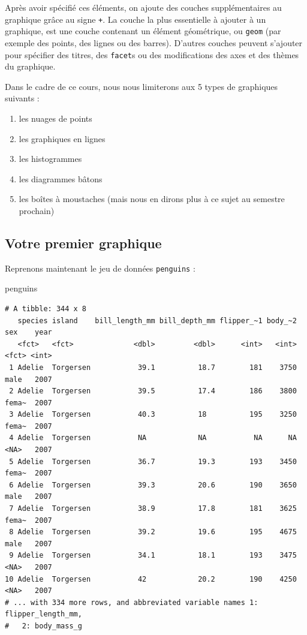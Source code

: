 \documentclass[
  letterpaper,
  DIV=11,
  numbers=noendperiod]{scrreprt}
\newenvironment{Shaded}{\begin{snugshade}}{\end{snugshade}}
\newcommand{\NormalTok}[1]{\textcolor[rgb]{0.00,0.23,0.31}{#1}}
\providecommand{\tightlist}{%
  \setlength{\itemsep}{0pt}\setlength{\parskip}{0pt}}\usepackage{longtable,booktabs,array}
\begin{document}
Après avoir spécifié ces éléments, on ajoute des couches supplémentaires
au graphique grâce au signe \texttt{+}. La couche la plus essentielle à
ajouter à un graphique, est une couche contenant un élément géométrique,
ou \texttt{geom} (par exemple des points, des lignes ou des barres).
D'autres couches peuvent s'ajouter pour spécifier des titres, des
\texttt{facet}s ou des modifications des axes et des thèmes du
graphique.

Dans le cadre de ce cours, nous nous limiterons aux 5 types de
graphiques suivants :

\begin{enumerate}
\def\labelenumi{\arabic{enumi}.}
\tightlist
\item
  les nuages de points
\item
  les graphiques en lignes
\item
  les histogrammes
\item
  les diagrammes bâtons
\item
  les boîtes à moustaches (mais nous en dirons plus à ce sujet au
  semestre prochain)
\end{enumerate}

\hypertarget{votre-premier-graphique}{%
\subsection{Votre premier graphique}\label{votre-premier-graphique}}

Reprenons maintenant le jeu de données \texttt{penguins} :

\begin{Shaded}
\begin{Highlighting}[]
\NormalTok{penguins}
\end{Highlighting}
\end{Shaded}

\begin{verbatim}
# A tibble: 344 x 8
   species island    bill_length_mm bill_depth_mm flipper_~1 body_~2 sex    year
   <fct>   <fct>              <dbl>         <dbl>      <int>   <int> <fct> <int>
 1 Adelie  Torgersen           39.1          18.7        181    3750 male   2007
 2 Adelie  Torgersen           39.5          17.4        186    3800 fema~  2007
 3 Adelie  Torgersen           40.3          18          195    3250 fema~  2007
 4 Adelie  Torgersen           NA            NA           NA      NA <NA>   2007
 5 Adelie  Torgersen           36.7          19.3        193    3450 fema~  2007
 6 Adelie  Torgersen           39.3          20.6        190    3650 male   2007
 7 Adelie  Torgersen           38.9          17.8        181    3625 fema~  2007
 8 Adelie  Torgersen           39.2          19.6        195    4675 male   2007
 9 Adelie  Torgersen           34.1          18.1        193    3475 <NA>   2007
10 Adelie  Torgersen           42            20.2        190    4250 <NA>   2007
# ... with 334 more rows, and abbreviated variable names 1: flipper_length_mm,
#   2: body_mass_g
\end{verbatim}
\end{document}
